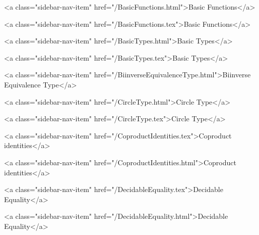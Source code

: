       
    
      
        
          <a class="sidebar-nav-item" href="/BasicFunctions.html">Basic Functions</a>
        
      
    
      
        
          <a class="sidebar-nav-item" href="/BasicFunctions.tex">Basic Functions</a>
        
      
    
      
        
          <a class="sidebar-nav-item" href="/BasicTypes.html">Basic Types</a>
        
      
    
      
        
          <a class="sidebar-nav-item" href="/BasicTypes.tex">Basic Types</a>
        
      
    
      
        
          <a class="sidebar-nav-item" href="/BiinverseEquivalenceType.html">Biinverse Equivalence Type</a>
        
      
    
      
        
          <a class="sidebar-nav-item" href="/CircleType.html">Circle Type</a>
        
      
    
      
        
          <a class="sidebar-nav-item" href="/CircleType.tex">Circle Type</a>
        
      
    
      
        
          <a class="sidebar-nav-item" href="/CoproductIdentities.tex">Coproduct identities</a>
        
      
    
      
        
          <a class="sidebar-nav-item" href="/CoproductIdentities.html">Coproduct identities</a>
        
      
    
      
        
          <a class="sidebar-nav-item" href="/DecidableEquality.tex">Decidable Equality</a>
        
      
    
      
        
          <a class="sidebar-nav-item" href="/DecidableEquality.html">Decidable Equality</a>
        
